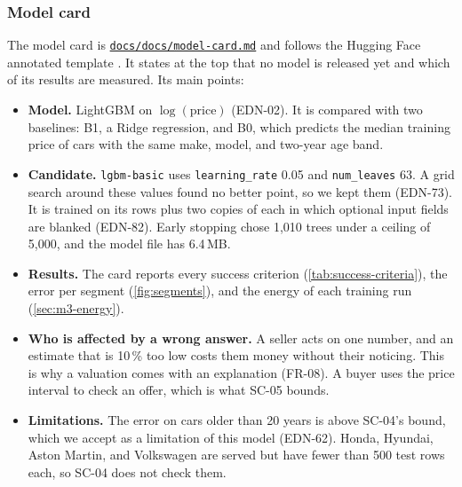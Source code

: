 \subsubsection{Model card}
\label{sec:m1-model-card}

The model card is \href{https://github.com/mlops-2627q1-mds-upc/MLOPS_Recommenditos/blob/main/docs/docs/model-card.md}{\texttt{docs/docs/model-card.md}} and follows the Hugging Face annotated template \cite{hf-model-card}.
It states at the top that no model is released yet and which of its results are measured.
Its main points:

\begin{itemize}
  \item \textbf{Model.} LightGBM on $\log(\mathrm{price})$ (EDN-02). It is compared with two baselines: B1, a Ridge regression, and B0, which predicts the median training price of cars with the same make, model, and two-year age band.
  \item \textbf{Candidate.} \texttt{lgbm-basic} uses \texttt{learning\_rate} 0.05 and \texttt{num\_leaves} 63. A grid search around these values found no better point, so we kept them (EDN-73). It is trained on its rows plus two copies of each in which optional input fields are blanked (EDN-82). Early stopping chose 1,010 trees under a ceiling of 5,000, and the model file has 6.4\,MB.
  \item \textbf{Results.} The card reports every success criterion (\cref{tab:success-criteria}), the error per segment (\cref{fig:segments}), and the energy of each training run (\cref{sec:m3-energy}).
  \item \textbf{Who is affected by a wrong answer.} A seller acts on one number, and an estimate that is 10\,\% too low costs them money without their noticing. This is why a valuation comes with an explanation (FR-08). A buyer uses the price interval to check an offer, which is what SC-05 bounds.
  \item \textbf{Limitations.} The error on cars older than 20 years is above SC-04's bound, which we accept as a limitation of this model (EDN-62). Honda, Hyundai, Aston Martin, and Volkswagen are served but have fewer than 500 test rows each, so SC-04 does not check them.
\end{itemize}

